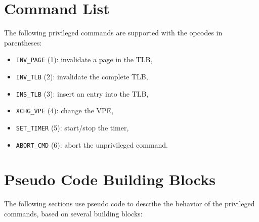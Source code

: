 \section{Command List}

The following privileged commands are supported with the opcodes in parentheses:

\begin{itemize}
  \item \texttt{INV\_PAGE} (1): invalidate a page in the TLB, 
  \item \texttt{INV\_TLB} (2): invalidate the complete TLB,
  \item \texttt{INS\_TLB} (3): insert an entry into the TLB, \extend{}
  \item \texttt{XCHG\_VPE} (4): change the VPE, 
  \item \texttt{SET\_TIMER} (5): start/stop the timer,
  \item \texttt{ABORT\_CMD} (6): abort the unprivileged command. \extend{}
\end{itemize}

\section{Pseudo Code Building Blocks}

The following sections use pseudo code to describe the behavior of the privileged commands, based on
several building blocks:

